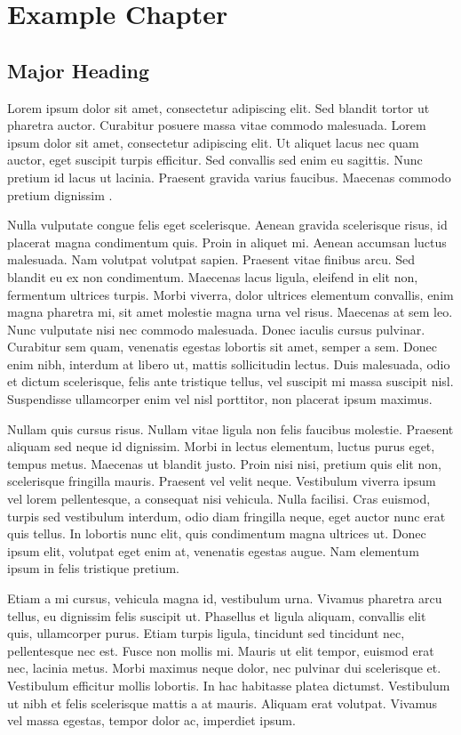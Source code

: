 \chapter{Example Chapter}
\section{Major Heading}

Lorem ipsum dolor sit amet, consectetur adipiscing elit. Sed blandit tortor ut pharetra auctor. Curabitur posuere massa vitae commodo malesuada. Lorem ipsum dolor sit amet, consectetur adipiscing elit. Ut aliquet lacus nec quam auctor, eget suscipit turpis efficitur. Sed convallis sed enim eu sagittis. Nunc pretium id lacus ut lacinia. Praesent gravida varius faucibus. Maecenas commodo pretium dignissim \cite{cohen_quantifying_2020}. 

Nulla vulputate congue felis eget scelerisque. Aenean gravida scelerisque risus, id placerat magna condimentum quis. Proin in aliquet mi. Aenean accumsan luctus malesuada. Nam volutpat volutpat sapien. Praesent vitae finibus arcu. Sed blandit eu ex non condimentum. Maecenas lacus ligula, eleifend in elit non, fermentum ultrices turpis. Morbi viverra, dolor ultrices elementum convallis, enim magna pharetra mi, sit amet molestie magna urna vel risus. Maecenas at sem leo. Nunc vulputate nisi nec commodo malesuada. Donec iaculis cursus pulvinar. Curabitur sem quam, venenatis egestas lobortis sit amet, semper a sem. Donec enim nibh, interdum at libero ut, mattis sollicitudin lectus. Duis malesuada, odio et dictum scelerisque, felis ante tristique tellus, vel suscipit mi massa suscipit nisl. Suspendisse ullamcorper enim vel nisl porttitor, non placerat ipsum maximus.

Nullam quis cursus risus. Nullam vitae ligula non felis faucibus molestie. Praesent aliquam sed neque id dignissim. Morbi in lectus elementum, luctus purus eget, tempus metus. Maecenas ut blandit justo. Proin nisi nisi, pretium quis elit non, scelerisque fringilla mauris. Praesent vel velit neque. Vestibulum viverra ipsum vel lorem pellentesque, a consequat nisi vehicula. Nulla facilisi. Cras euismod, turpis sed vestibulum interdum, odio diam fringilla neque, eget auctor nunc erat quis tellus. In lobortis nunc elit, quis condimentum magna ultrices ut. Donec ipsum elit, volutpat eget enim at, venenatis egestas augue. Nam elementum ipsum in felis tristique pretium.

Etiam a mi cursus, vehicula magna id, vestibulum urna. Vivamus pharetra arcu tellus, eu dignissim felis suscipit ut. Phasellus et ligula aliquam, convallis elit quis, ullamcorper purus. Etiam turpis ligula, tincidunt sed tincidunt nec, pellentesque nec est. Fusce non mollis mi. Mauris ut elit tempor, euismod erat nec, lacinia metus. Morbi maximus neque dolor, nec pulvinar dui scelerisque et. Vestibulum efficitur mollis lobortis. In hac habitasse platea dictumst. Vestibulum ut nibh et felis scelerisque mattis a at mauris. Aliquam erat volutpat. Vivamus vel massa egestas, tempor dolor ac, imperdiet ipsum.

